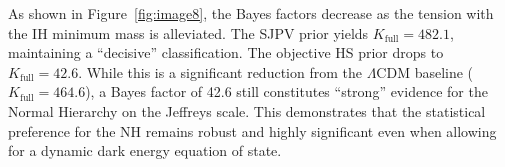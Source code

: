 \documentclass[]{article}
\begin{document}
As shown in Figure~\ref{fig:image8}, the Bayes factors decrease as the tension with the IH minimum mass is alleviated. The SJPV prior yields $K_{\text{full}} = 482.1$, maintaining a ``decisive'' classification. The objective HS prior drops to $K_{\text{full}} = 42.6$. While this is a significant reduction from the $\Lambda$CDM baseline ($K_{\text{full}} = 464.6$), a Bayes factor of 42.6 still constitutes ``strong'' evidence for the Normal Hierarchy on the Jeffreys scale. This demonstrates that the statistical preference for the NH remains robust and highly significant even when allowing for a dynamic dark energy equation of state.
\end{document}
